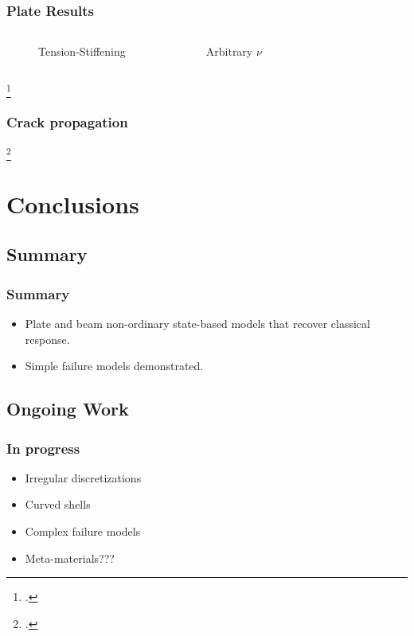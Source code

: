 %
%
%
\begin{frame}
  \frametitle{Plate Results}
    \begin{columns}[T] %
     

    \begin{figure}
        \centering
        \resizebox{\linewidth}{!}{}
        \caption{Tension-Stiffening}
    \end{figure}


    \begin{figure}
        \centering
        \resizebox{\linewidth}{!}{}
        \caption{Arbitrary $\nu$}
    \end{figure}
    
    \end{columns}
\footcite{jogrady2014b}
\end{frame}
%
%
\begin{frame}
\frametitle{Crack propagation}

\vspace{-0.42cm}
\begin{figure}
	\centering
	\scalebox{0.28}{}
\end{figure}
     
\footcite{jogrady2014b}
\end{frame}
%
%
\section{Conclusions}
%
\subsection{Summary}
%
\begin{frame}
\frametitle{Summary}
  \begin{itemize}
    \item Plate and beam non-ordinary state-based models that recover classical response.
    \item Simple failure models demonstrated.
  \end{itemize}

\end{frame}
%
\subsection{Ongoing Work}
%
\begin{frame}
  \frametitle{In progress}
  \begin{itemize}
    \item Irregular discretizations
    \item Curved shells
    \item Complex failure models
    \item Meta-materials???
  \end{itemize}

\end{frame}
%

